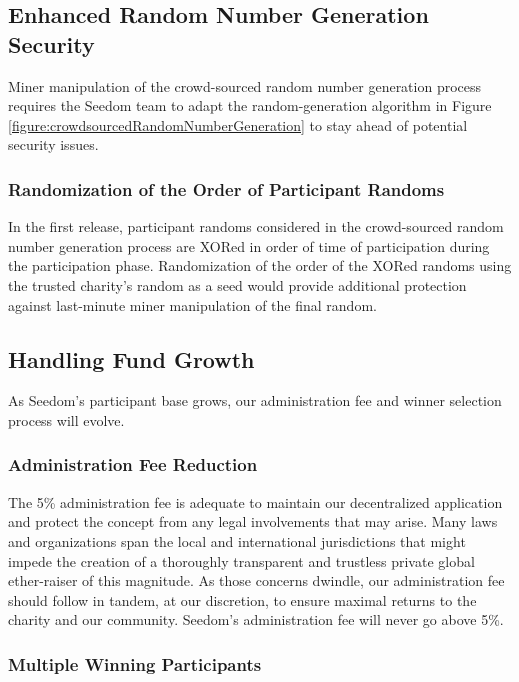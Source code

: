 \documentclass[11pt]{article}
\begin{document}
\subsection{Enhanced Random Number Generation Security}

Miner manipulation of the crowd-sourced random number generation process requires the Seedom team to adapt the random-generation algorithm in Figure \ref{figure:crowdsourcedRandomNumberGeneration} to stay ahead of potential security issues.

\subsubsection{Randomization of the Order of Participant Randoms}

In the first release, participant randoms considered in the crowd-sourced random number generation process are XORed in order of time of participation during the participation phase. Randomization of the order of the XORed randoms using the trusted charity's random as a seed would provide additional protection against last-minute miner manipulation of the final random.

\subsection{Handling Fund Growth}

As Seedom's participant base grows, our administration fee and winner selection process will evolve.

\subsubsection{Administration Fee Reduction}

The 5\% administration fee is adequate to maintain our decentralized application and protect the concept from any legal involvements that may arise. Many laws and organizations span the local and international jurisdictions that might impede the creation of a thoroughly transparent and trustless private global ether-raiser of this magnitude. As those concerns dwindle, our administration fee should follow in tandem, at our discretion, to ensure maximal returns to the charity and our community. Seedom's administration fee will never go above 5\%.

\subsubsection{Multiple Winning Participants}
\end{document}
